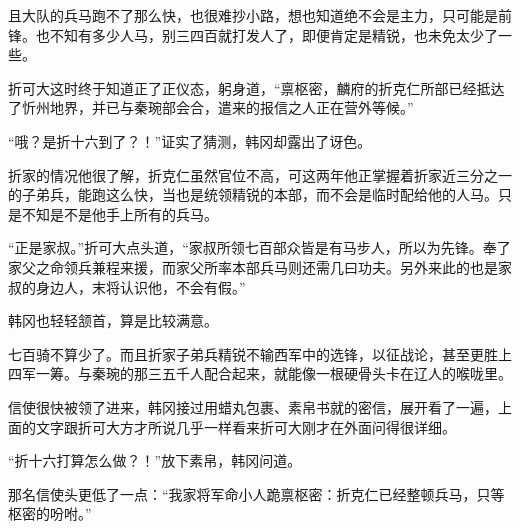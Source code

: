 且大队的兵马跑不了那么快，也很难抄小路，想也知道绝不会是主力，只可能是前锋。也不知有多少人马，别三四百就打发人了，即便肯定是精锐，也未免太少了一些。

折可大这时终于知道正了正仪态，躬身道，“禀枢密，麟府的折克仁所部已经抵达了忻州地界，并已与秦琬部会合，遣来的报信之人正在营外等候。”

“哦？是折十六到了？！”证实了猜测，韩冈却露出了讶色。

折家的情况他很了解，折克仁虽然官位不高，可这两年他正掌握着折家近三分之一的子弟兵，能跑这么快，当也是统领精锐的本部，而不会是临时配给他的人马。只是不知是不是他手上所有的兵马。

“正是家叔。”折可大点头道，“家叔所领七百部众皆是有马步人，所以为先锋。奉了家父之命领兵兼程来援，而家父所率本部兵马则还需几曰功夫。另外来此的也是家叔的身边人，末将认识他，不会有假。”

韩冈也轻轻颔首，算是比较满意。

七百骑不算少了。而且折家子弟兵精锐不输西军中的选锋，以征战论，甚至更胜上四军一筹。与秦琬的那三五千人配合起来，就能像一根硬骨头卡在辽人的喉咙里。

信使很快被领了进来，韩冈接过用蜡丸包裹、素帛书就的密信，展开看了一遍，上面的文字跟折可大方才所说几乎一样看来折可大刚才在外面问得很详细。

“折十六打算怎么做？！”放下素帛，韩冈问道。

那名信使头更低了一点：“我家将军命小人跪禀枢密：折克仁已经整顿兵马，只等枢密的吩咐。”

